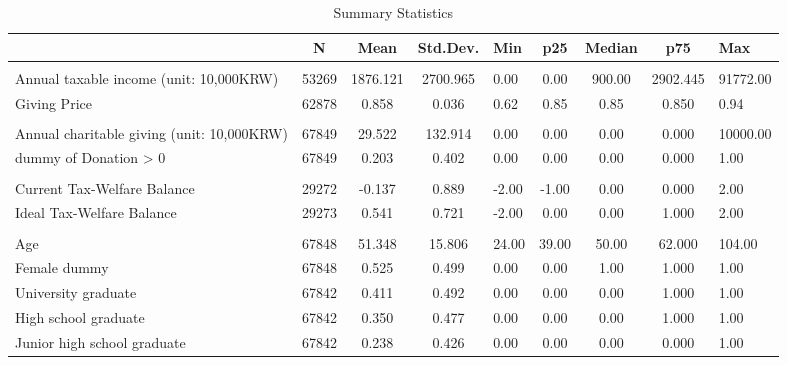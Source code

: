 \documentclass[ review  , 3p ]{elsarticle}
\begin{document}
  \begin{table}

  \caption{\label{tab:kableSummaryCovariate}Summary Statistics}
  \centering
  \fontsize{7}{9}\selectfont
  \begin{tabular}[t]{lccclcccl}
  \toprule
   & N & Mean & Std.Dev. & Min & p25 & Median & p75 & Max\\
  \midrule
  \addlinespace[0.3em]
  \multicolumn{9}{l}{\textbf{Income and Giving Price}}\\
  \hspace{1em}Annual taxable income (unit: 10,000KRW) & 53269 & 1876.121 & 2700.965 & 0.00 & 0.00 & 900.00 & 2902.445 & 91772.00\\
  \hspace{1em}Giving Price & 62878 & 0.858 & 0.036 & 0.62 & 0.85 & 0.85 & 0.850 & 0.94\\
  \addlinespace[0.3em]
  \multicolumn{9}{l}{\textbf{Charitable Donations}}\\
  \hspace{1em}Annual charitable giving (unit: 10,000KRW) & 67849 & 29.522 & 132.914 & 0.00 & 0.00 & 0.00 & 0.000 & 10000.00\\
  \hspace{1em}dummy of Donation > 0 & 67849 & 0.203 & 0.402 & 0.00 & 0.00 & 0.00 & 0.000 & 1.00\\
  \addlinespace[0.3em]
  \multicolumn{9}{l}{\textbf{Government Efficiency}}\\
  \hspace{1em}Current Tax-Welfare Balance & 29272 & -0.137 & 0.889 & -2.00 & -1.00 & 0.00 & 0.000 & 2.00\\
  \hspace{1em}Ideal Tax-Welfare Balance & 29273 & 0.541 & 0.721 & -2.00 & 0.00 & 0.00 & 1.000 & 2.00\\
  \addlinespace[0.3em]
  \multicolumn{9}{l}{\textbf{Individual Characteristics}}\\
  \hspace{1em}Age & 67848 & 51.348 & 15.806 & 24.00 & 39.00 & 50.00 & 62.000 & 104.00\\
  \hspace{1em}Female dummy & 67848 & 0.525 & 0.499 & 0.00 & 0.00 & 1.00 & 1.000 & 1.00\\
  \hspace{1em}University graduate & 67842 & 0.411 & 0.492 & 0.00 & 0.00 & 0.00 & 1.000 & 1.00\\
  \hspace{1em}High school graduate & 67842 & 0.350 & 0.477 & 0.00 & 0.00 & 0.00 & 1.000 & 1.00\\
  \hspace{1em}Junior high school graduate & 67842 & 0.238 & 0.426 & 0.00 & 0.00 & 0.00 & 0.000 & 1.00\\
  \bottomrule
  \end{tabular}
  \end{table}
\end{document}
